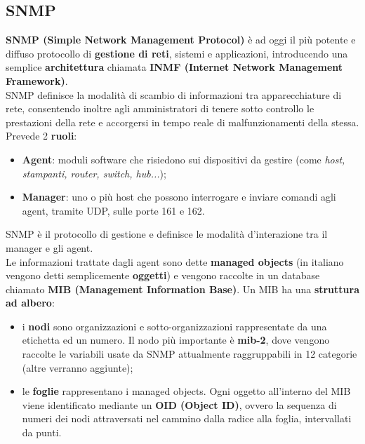     \subsection{SNMP}

        \textbf{SNMP (Simple Network Management Protocol)} è ad oggi il più potente e diffuso protocollo
        di \textbf{gestione di reti}, sistemi e applicazioni, introducendo una semplice \textbf{architettura} chiamata
        \textbf{INMF (Internet Network Management Framework)}.\\

        SNMP definisce la modalità di scambio di informazioni tra apparecchiature di rete, consentendo
        inoltre agli amministratori di tenere sotto controllo le prestazioni della rete e accorgersi in
        tempo reale di malfunzionamenti della stessa.\\

        Prevede 2 \textbf{ruoli}:
        
        \begin{itemize}
            \item \textbf{Agent}: moduli software che risiedono sui dispositivi da gestire (come \emph{host, stampanti,
            router, switch, hub...});
            \item \textbf{Manager}: uno o più host che possono interrogare e inviare comandi agli agent, tramite
            UDP, sulle porte 161 e 162.
        \end{itemize}

        SNMP è il protocollo di gestione e definisce le modalità d’interazione tra il manager e gli agent.\\

        Le informazioni trattate dagli agent sono dette \textbf{managed objects} (in italiano vengono detti
        semplicemente \textbf{oggetti}) e vengono raccolte in un database chiamato \textbf{MIB (Management
        Information Base)}. Un MIB ha una \textbf{struttura ad albero}:

        \begin{itemize}
            \item i \textbf{nodi} sono organizzazioni e sotto-organizzazioni rappresentate da una etichetta ed un
            numero. Il nodo più importante è \textbf{mib-2}, dove vengono raccolte le variabili usate da
            SNMP attualmente raggruppabili in 12 categorie (altre verranno aggiunte);
            \item le \textbf{foglie} rappresentano i managed objects. Ogni oggetto all’interno del MIB viene
            identificato mediante un \textbf{OID (Object ID)}, ovvero la sequenza di numeri dei nodi
            attraversati nel cammino dalla radice alla foglia, intervallati da punti.
        \end{itemize}

